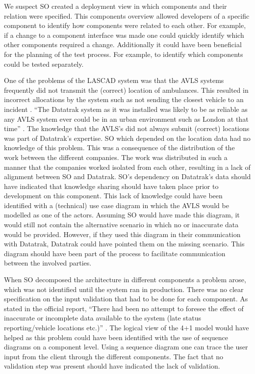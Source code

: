 We suspect SO created a deployment view in which components and their relation were specified.
This components overview allowed developers of a specific component to identify how components were related to each other.
For example, if a change to a component interface was made one could quickly identify which other components required a change.
Additionally it could have been beneficial for the planning of the test process.
For example, to identify which components could be tested separately.

One of the problems of the LASCAD system was that the AVLS systems frequently did not transmit the (correct) location of ambulances.
This resulted in incorrect allocations by the system such as not sending the closest vehicle to an incident \autocite[4022]{officialreport}.
``The Datatrak system as it was installed was likely to be as reliable as any AVLS system ever could be in an urban environment such as London at that time'' \autocite[3133]{officialreport}.
The knowledge that the AVLS’s did not always submit (correct) locations was part of Datatrak’s expertise.
SO which depended on the location data had no knowledge of this problem.
This was a consequence of the distribution of the work between the different companies.
The work was distributed in such a manner that the companies worked isolated from each other, resulting in a lack of alignment between SO and Datatrak.
SO’s dependency on Datatrak’s data should have indicated that knowledge sharing should have taken place prior to development on this component.
This lack of knowledge could have been identified with a (technical) use case diagram in which the AVLS would be modelled as one of the actors.
Assuming SO would have made this diagram, it would still not contain the alternative scenario in which no or inaccurate data would be provided.
However, if they used this diagram in their communication with Datatrak, Datatrak could have pointed them on the missing scenario.
This diagram should have been part of the process to facilitate communication between the involved parties.

When SO decomposed the architecture in different components a problem arose, which was not identified until the system ran in production.
There was no clear specification on the input validation that had to be done for each component.
As stated in the official report, ``There had been no attempt to foresee the effect of inaccurate or incomplete data available to the system (late status reporting/vehicle locations etc.)'' \autocite[4001]{officialreport}.
The logical view of the 4+1 model would have helped as this problem could have been identified with the use of sequence diagrams on a component level.
Using a sequence diagram one can trace the user input from the client through the different components.
The fact that no validation step was present should have indicated the lack of validation.